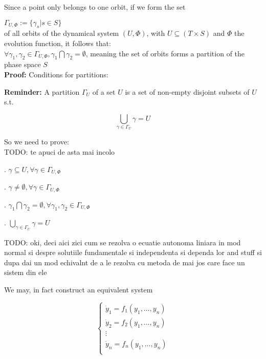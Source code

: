 Since a point only belongs to one orbit, if we form the set \par

$\Gamma_{U,\Phi}:=\{ \gamma_s | s \in S \}$  \\
of all orbits of the dynamical system $(U,\Phi)$, with $U\subseteq (T \times S)$ and $\Phi$ the evolution function, it follows that: \\
$\forall \gamma_1,\gamma_2 \in \Gamma_{U, \Phi}, \gamma_1 \bigcap \gamma_2 = \emptyset$, meaning the set of orbits forms a partition of the phase space $S$
\hspace{20 mm}
\\
\textbf{Proof:}
Conditions for partitions:
\par  \textbf{Reminder:} A partition $\Gamma_U$ of a set $U$ is a set of non-empty disjoint subsets of $U$ s.t.

\[
    \bigcup_{\gamma\in \Gamma_U} \gamma = U
\]

So we need to prove:\\

TODO: te apuci de asta mai incolo \par
{}. $\gamma \subseteq U, \forall \gamma \in \Gamma_{U,\Phi}$ \par
{}. $ \gamma \neq \emptyset, \forall \gamma \in \Gamma_{U,\Phi}$ \par
{}. $\gamma_1 \bigcap \gamma_2 = \emptyset, \forall \gamma_1, \gamma_2 \in \Gamma_{U,\Phi}$ \par
{}. $\bigcup_{\gamma\in \Gamma_U} \gamma = U$ \par
\vspace{5mm}

TODO: oki, deci aici zici cum se rezolva o ecuatie autonoma liniara in mod normal si despre solutiile fundamentale si independenta si dependa lor and stuff si dupa dai un mod echivalnt de a le rezolva cu metoda de mai jos care face un sistem din ele

We may, in fact construct an equivalent system

\[
    \begin{cases}
        \dot{y}_1 = f_1(y_1,\dots, y_n) \\
        \dot{y}_2 = f_2(y_1,\dots, y_n) \\
        \vdots                          \\
        \dot{y}_n = f_n(y_1,\dots, y_n) \\
    \end{cases}
\]

